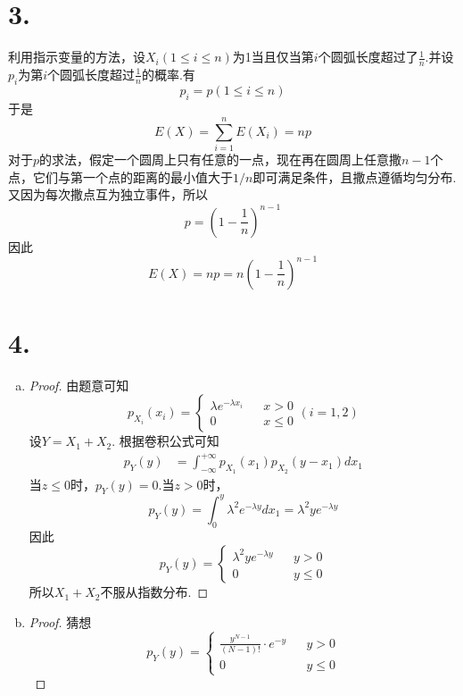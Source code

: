 \documentclass[twocolumn]{article}
\begin{document}
\begin{CJK}{UTF8}{gbsn}
			\section*{3.}
				利用指示变量的方法，设$X_i(1\le i\le n)$为1当且仅当第$i$个圆弧长度超过了$\frac{1}{n}$.并设$p_i$为第$i$个圆弧长度超过$\frac{1}{n}$的概率.有\[p_i=p(1\le i\le n)\]于是\[E(X)=\sum_{i=1}^{n}E(X_i)=np\]对于$p$的求法，假定一个圆周上只有任意的一点，现在再在圆周上任意撒$n-1$个点，它们与第一个点的距离的最小值大于$1/n$即可满足条件，且撒点遵循均匀分布.又因为每次撒点互为独立事件，所以\[p=(1-\frac{1}{n})^{n-1}\]因此\[E(X)=np=n(1-\frac{1}{n})^{n-1}\]
			\section*{4.}
				\begin{enumerate}[a)]
					\item \begin{proof}
						由题意可知\begin{equation*}
						p_{X_i}(x_i)=\left\{
						\begin{array}{rcl}
						\lambda e^{-\lambda x_i} & & {x>0}\\
						0 & & {x\le0}
						\end{array} \right.(i=1,2)
						\end{equation*}设$Y=X_1+X_2$.
						根据卷积公式可知\begin{align*}
							p_Y(y) & = \int_{-\infty}^{+\infty}p_{X_1}(x_1)p_{X_2}(y-x_1)dx_1
						\end{align*}
						当$z\le0$时，$p_Y(y)=0$.当$z>0$时，\[p_Y(y)=\int_{0}^{y}\lambda^2e^{-\lambda y}dx_1=\lambda^2ye^{-\lambda y}\]因此\begin{equation*}
						p_Y(y)=\left\{
						\begin{array}{rcl}
							\lambda^2 ye^{-\lambda y} & & {y>0}\\
							0 & & {y\le0}
						\end{array} \right.
					\end{equation*}
						所以$X_1+X_2$不服从指数分布.
					\end{proof}
				\item \begin{proof}
					猜想\begin{equation*}
					p_Y(y)=\left\{
					\begin{array}{rcl}
					\frac{y^{N-1}}{(N-1)!}\cdot e^{-y} & & {y>0}\\
					0 & & {y\le0}
					\end{array} \right.

\end{equation*}
\end{proof}
\end{enumerate}
\end{CJK}
\end{document}
